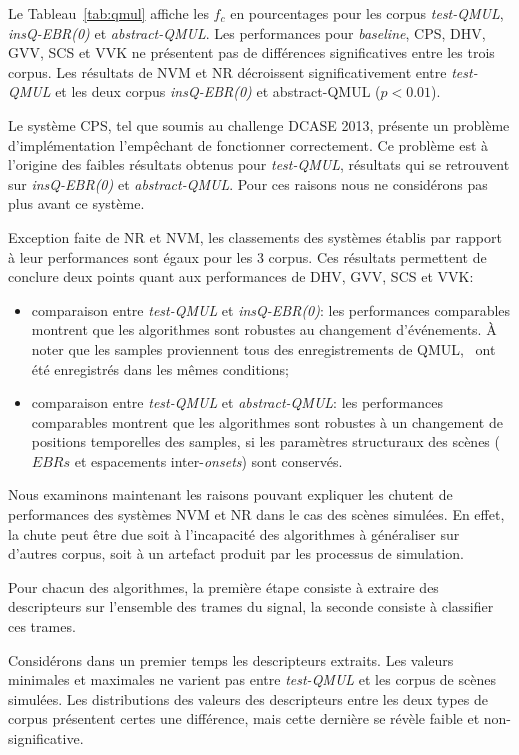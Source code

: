 Le Tableau~\ref{tab:qmul} affiche les $f_c$ en pourcentages pour les corpus \emph{test-QMUL}, \emph{insQ-EBR(0)} et \emph{abstract-QMUL}. Les performances pour \emph{baseline}, CPS, DHV, GVV, SCS et VVK ne présentent pas de différences significatives entre les trois corpus. Les résultats de NVM et NR décroissent significativement entre \emph{test-QMUL} et les deux corpus \emph{insQ-EBR(0)} et abstract-QMUL ($p<0.01$).

Le système CPS, tel que soumis au challenge DCASE 2013, présente un problème d'implémentation l'empêchant de fonctionner correctement. Ce problème est à l'origine des faibles résultats obtenus pour \emph{test-QMUL}, résultats qui se retrouvent sur \emph{insQ-EBR(0)} et \emph{abstract-QMUL}. Pour ces raisons nous ne considérons pas plus avant ce système.

Exception faite de NR et NVM, les classements des systèmes établis par rapport à leur performances sont égaux pour les 3 corpus. Ces résultats permettent de conclure deux points quant aux performances de DHV, GVV, SCS et VVK:

\begin{itemize}
\item comparaison entre \emph{test-QMUL} et \emph{insQ-EBR(0)}: les performances comparables montrent que les algorithmes sont robustes au changement d'événements. À noter que les samples proviennent tous des enregistrements de QMUL, \ie~ont été enregistrés dans les mêmes conditions;
\item comparaison entre \emph{test-QMUL} et \emph{abstract-QMUL}: les performances comparables montrent que les algorithmes sont robustes à un changement de positions temporelles des samples, si les paramètres structuraux des scènes ($EBRs$ et espacements inter-\emph{onsets}) sont conservés.
\end{itemize}
  
Nous examinons maintenant les raisons pouvant expliquer les chutent de performances des systèmes NVM et NR dans le cas des scènes simulées. En effet, la chute peut être due soit à l'incapacité des algorithmes à généraliser sur d'autres corpus, soit à un artefact produit par les processus de simulation.

Pour chacun des algorithmes, la première étape consiste à extraire des descripteurs sur l'ensemble des trames du signal, la seconde consiste à classifier ces trames.

Considérons dans un premier temps les descripteurs extraits. Les valeurs minimales et maximales ne varient pas entre \emph{test-QMUL} et les corpus de scènes simulées. Les distributions des valeurs des descripteurs entre les deux types de corpus présentent certes une différence, mais cette dernière se révèle faible et non-significative.  

